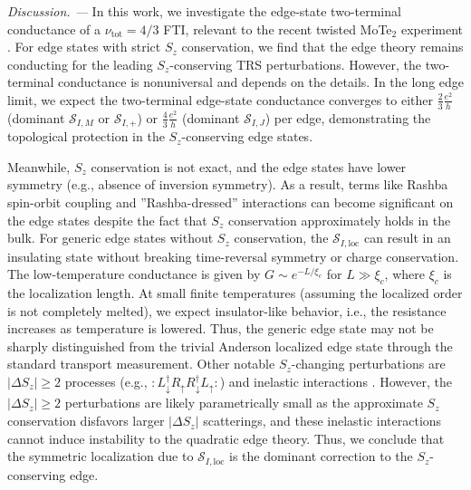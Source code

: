 \documentclass[aps,prx,amsmath,superscriptaddress,twocolumn,bibnotes,longbibliography,floatfix]{revtex4-2}
\begin{document}
	\textit{Discussion. ---} In this work, we investigate the edge-state two-terminal conductance of a $\nu_{\text{tot}}=4/3$ FTI, relevant to the recent twisted MoTe$_2$ experiment \cite{WangY2026}. For edge states with strict $S_z$ conservation, we find that the edge theory remains conducting for the leading $S_z$-conserving TRS perturbations. However, the two-terminal conductance is nonuniversal and depends on the details. In the long edge limit, we expect the two-terminal edge-state conductance converges to either $\frac{2}{3}\frac{e^2}{h}$ (dominant $\mathcal{S}_{I,M}$ or $\mathcal{S}_{I,+}$) or $\frac{4}{3}\frac{e^2}{h}$ (dominant $\mathcal{S}_{I,J}$) per edge, demonstrating the topological protection in the $S_z$-conserving edge states.

	Meanwhile, $S_z$ conservation is not exact, and the edge states have lower symmetry (e.g., absence of inversion symmetry). As a result, terms like Rashba spin-orbit coupling and ''Rashba-dressed'' interactions can become significant on the edge states despite the fact that $S_z$ conservation approximately holds in the bulk. For generic edge states without $S_z$ conservation, the $\mathcal{S}_{I,\text{loc}}$ can result in an insulating state without breaking time-reversal symmetry or charge conservation. The low-temperature conductance is given by $G\sim e^{-L/\xi_c}$ for $L\gg \xi_c$, where $\xi_c$ is the localization length. At small finite temperatures (assuming the localized order is not completely melted), we expect insulator-like behavior, i.e., the resistance increases as temperature is lowered. Thus, the generic edge state may not be sharply distinguished from the trivial Anderson localized edge state through the standard transport measurement. Other notable $S_z$-changing perturbations are $|\Delta S_z|\ge 2$ processes (e.g., $:L^{\dagger}_{\downarrow}R_{\uparrow}R^{\dagger}_{\downarrow}L_{\uparrow}:$) and inelastic interactions \cite{SchmidtTL2012,LezmyN2012,ChouYZ2015,KainarisN2014,KainarisN2017,ZhangX2021}. However, the $|\Delta S_z|\ge 2$ perturbations are likely parametrically small as the approximate $S_z$ conservation disfavors larger $|\Delta S_z|$ scatterings, and these inelastic interactions \cite{SchmidtTL2012,LezmyN2012,ChouYZ2015,KainarisN2014,KainarisN2017,ZhangX2021} cannot induce instability to the quadratic edge theory. Thus, we conclude that the symmetric localization due to $\mathcal{S}_{I,\text{loc}}$ is the dominant correction to the $S_z$-conserving edge.
\end{document}
